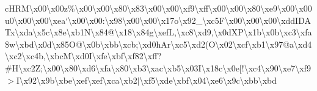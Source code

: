 \begin{DoxyCompactItemize}
c\+H\+R\+M\textbackslash{}x00\textbackslash{}x00z\%\textbackslash{}x00\textbackslash{}x00\textbackslash{}x80\textbackslash{}x83\textbackslash{}x00\textbackslash{}x00\textbackslash{}xf9\textbackslash{}xff\textbackslash{}x00\textbackslash{}x00\textbackslash{}x80\textbackslash{}xe9\textbackslash{}x00\textbackslash{}x00u0\textbackslash{}x00\textbackslash{}x00\textbackslash{}xea`\textbackslash{}x00\textbackslash{}x00\+:\textbackslash{}x98\textbackslash{}x00\textbackslash{}x00\textbackslash{}x17o\textbackslash{}x92\+\_\+\textbackslash{}xc5\+F\textbackslash{}x00\textbackslash{}x00\textbackslash{}x00\textbackslash{}xdd\+I\+D\+A\+Tx\textbackslash{}xda\textbackslash{}x5c\textbackslash{}x8e\textbackslash{}xb1\+N\textbackslash{}x84@\textbackslash{}x18\textbackslash{}x84g\textbackslash{}xef\+L,\textbackslash{}xc8\textbackslash{}xd9,\textbackslash{}x0d\+X\+P\textbackslash{}x1b\textbackslash{}x0b\textbackslash{}xc3\textbackslash{}xfa\$w\textbackslash{}xbd\textbackslash{}x0d\textbackslash{}x85\+O@\textbackslash{}x0b\textbackslash{}xbb\textbackslash{}xcb;\textbackslash{}xd0h\+Ar\textbackslash{}xc5\textbackslash{}xd2(\+O\textbackslash{}x02\textbackslash{}xcf\textbackslash{}xb1\textbackslash{}x97@a\textbackslash{}xd4\textbackslash{}xc2\textbackslash{}xc4b,\textbackslash{}xbc\+M\textbackslash{}xd0\+I\textbackslash{}xfe\textbackslash{}xbf\textbackslash{}xf82\textbackslash{}xff?\#\+H\textbackslash{}xc2\+Z;\textbackslash{}x00\textbackslash{}x80\textbackslash{}xd6\textbackslash{}xfa\textbackslash{}x80\textbackslash{}xb3\textbackslash{}xac\textbackslash{}xb5\textbackslash{}x03\+I\textbackslash{}x18c\textbackslash{}x0e\mbox{[}!\textbackslash{}xc4\textbackslash{}x90\textbackslash{}xe7\textbackslash{}xf9$>$\+I\textbackslash{}x92\textbackslash{}x9b\textbackslash{}xbe\textbackslash{}xef\textbackslash{}xef\textbackslash{}xca\textbackslash{}xb2$\vert$\textbackslash{}xf5\textbackslash{}xde\textbackslash{}xbf\textbackslash{}x04\textbackslash{}xe6\textbackslash{}x9c\textbackslash{}xbb\textbackslash{}xbd 
\end{DoxyCompactItemize}
